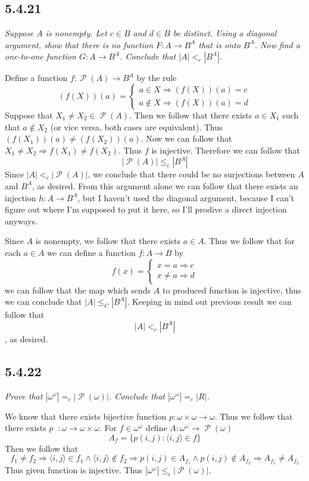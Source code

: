\documentclass[11pt,oneside,titlepage]{book}
\DeclareMathOperator \pow {\mathcal {P}}
\DeclareMathOperator \inv {^{-1}}
\DeclareMathOperator \ra {\Rightarrow}
\newcommand{\eangle}[1]{\langle #1 \rangle}
\begin{document}
\subsection*{5.4.21}

\textit{Suppose $A$ is nonempty. Let $c \in B$ and $d \in B$ be distinct. Using a diagonal argument,
  show that there is no function $F: A \to B^A$ that is onto $B^A$. Now find a one-to-one
  function $G: A \to B^A$. Conclude that $|A| <_c |B^A|$.}

Define a function $f: \pow(A) \to B^A$ by the rule
$$(f(X))(a) =
\begin{cases}
  a \in X \ra (f(X))(a) = c \\
  a \notin X \ra (f(X))(a) = d
\end{cases}
$$
Suppose that $X_1 \neq X_2 \in \pow(A)$. Then we follow that there exists $a \in X_1$ such that
$a \notin X_2$ (or vice versa, both cases are equivalent).
Thus $(f(X_1))(a) \neq (f(X_2))(a)$. Now we can follow that $X_1 \neq X_2 \ra f(X_1) \neq f(X_2)$.
Thus $f$ is injective. Therefore we can follow that
$$|\pow(A)| \leq_c |B^A|$$
Since $|A| <_c |\pow(A)|$, we conclude that there could be no surjections between $A$ and $B^A$,
as desired. From this argument alone we can follow that there exists an injection
$h: A \to B^A$, but I haven't used the diagonal argument, because I can't figure out where
I'm supposed to put it here, so I'll prodive a direct injection anyways.

Since $A$ is nonempty, we follow that there exists $a \in A$. Thus we follow that
for each $a \in A$ we can define a function $f: A \to B$ by
$$f(x) =
\begin{cases}
  x = a \ra c\\
  x \neq a \ra d
\end{cases}
$$
we can follow that the map which sends $A$ to produced function is injective, thus we
can conclude that $|A| \leq_C |B^A|$. Keeping in mind out previous result we can follow that
$$|A| <_c |B^A|$$, as desired.

\subsection*{5.4.22}

\textit{Prove that $|\omega^\omega| =_c |\pow(\omega)|$. Conclude that $|\omega^\omega| =_c |R|$.}

We know that there exists bijective function $p: \omega \times \omega \to \omega$. Thus we
follow that there exists $p \inv: \omega \to \omega \times \omega$. For $f \in
\omega^\omega$ define $A: \omega^\omega \to \pow(\omega)$
$$A_f = \{p(i, j): \eangle{i, j} \in f\}$$
Then we follow that
$$f_1 \neq f_2 \ra \eangle{i, j} \in f_1 \land \eangle{i, j} \notin f_2 \ra
p(i, j) \in A_{f_1} \land p(i, j) \notin  A_{f_2} \ra A_{f_1} \neq A_{f_2}$$
Thus given function is injective. Thus $ |\omega^\omega|  \leq_c |\pow(\omega)|$.
\end{document}
